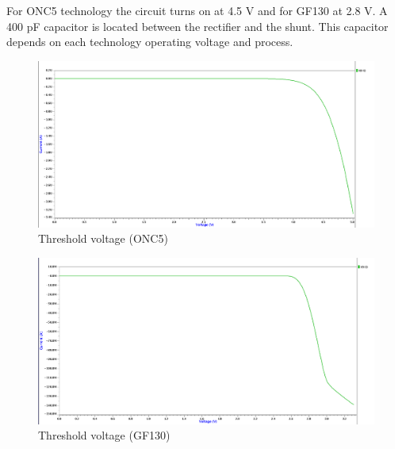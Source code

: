\documentclass[a4paper, 10pt, conference]{ieeeconf}      %
\begin{document}
For ONC5 technology the circuit turns on at 4.5 V and for GF130 at 2.8 V. A 400 pF capacitor is located between the rectifier and the shunt. This capacitor depends on each technology operating voltage and process.
\begin{figure}[H]
\centering
\includegraphics[width=0.9\linewidth]{Images/ImagenesTesina/simulaciones/shunt_500.png}
\caption{Threshold voltage (ONC5)}
\label{fig:shunt_500}
\end{figure}

\begin{figure}[H]
\centering
\includegraphics[width=0.9\linewidth]{Images/ImagenesTesina/simulaciones/shunt_130.png}
\caption{Threshold voltage (GF130)}
\label{fig:shunt_130}
\end{figure}
\end{document}
